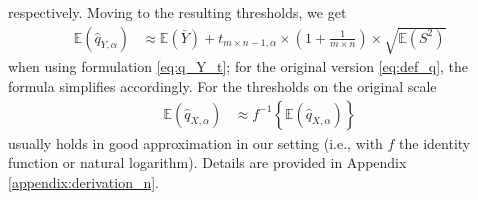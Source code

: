 \documentclass[12pt]{article}
\newcommand{\sd}{s}
\newcommand{\mean}{\bar{y}}
\begin{document}
respectively. Moving to the resulting thresholds, we get
\begin{align}
\mathbb{E}(\hat{q}_{Y, \alpha}) & \approx \mathbb{E}(\bar{Y}) + t_{m\times n - 1, \alpha} \times \left(1 + \frac{1}{m\times n} \right) \times \sqrt{\mathbb{E}(S^2)}
\label{eq:expectation_q}
\end{align}
when using formulation \eqref{eq:q_Y_t}; for the original version \eqref{eq:def_q}, the formula simplifies accordingly. For the thresholds on the original scale
\begin{align}
\mathbb{E}(\hat{q}_{X, \alpha}) & \approx f^{-1}\left\{\mathbb{E}(\hat{q}_{X, \alpha})\right\}
\label{eq:expectation_q2}
\end{align}
usually holds in good approximation in our setting (i.e., with $f$ the identity function or natural logarithm). Details are provided in Appendix \ref{appendix:derivation_n}.
\end{document}
